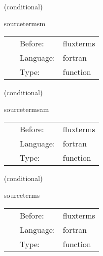 \vspace{5mm}

   (conditional) 

\hspace{5mm} sourcetermsm 

\hspace{5mm}{\it source term calculation - mhd version } 


\hspace{5mm}

 \begin{tabular*}{160mm}{cll} 
~ & Before:  & fluxterms \\ 
~ & Language:  & fortran \\ 
~ & Type:  & function \\ 
\end{tabular*} 


\vspace{5mm}

   (conditional) 

\hspace{5mm} sourcetermsam 

\hspace{5mm}{\it source term calculation - vector potential mhd version } 


\hspace{5mm}

 \begin{tabular*}{160mm}{cll} 
~ & Before:  & fluxterms \\ 
~ & Language:  & fortran \\ 
~ & Type:  & function \\ 
\end{tabular*} 


\vspace{5mm}

   (conditional) 

\hspace{5mm} sourceterms 

\hspace{5mm}{\it source term calculation } 


\hspace{5mm}

 \begin{tabular*}{160mm}{cll} 
~ & Before:  & fluxterms \\ 
~ & Language:  & fortran \\ 
~ & Type:  & function \\ 
\end{tabular*} 


